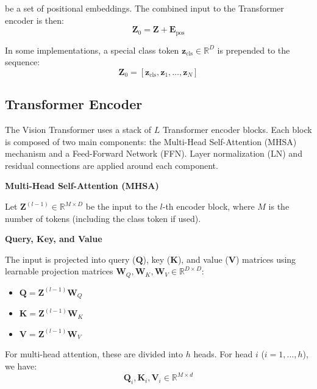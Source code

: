 be a set of positional embeddings. The combined input to the Transformer encoder is then:
\begin{equation}
  \mathbf{Z}_0 = \mathbf{Z} + \mathbf{E}_{\text{pos}}
\end{equation}

In some implementations, a special class token \(\mathbf{z}_{\text{cls}} \in \mathbb{R}^{D}\) is prepended to the sequence:
\begin{equation}
  \mathbf{Z}_0 = \left[\mathbf{z}_{\text{cls}}, \mathbf{z}_1, \dots, \mathbf{z}_N \right]
\end{equation}

\subsection{Transformer Encoder}

The Vision Transformer uses a stack of \(L\) Transformer encoder blocks. Each block is composed of two main components: the Multi-Head Self-Attention (MHSA) mechanism and a Feed-Forward Network (FFN). Layer normalization (LN) and residual connections are applied around each component.

\textbf{Multi-Head Self-Attention (MHSA)}

Let \(\mathbf{Z}^{(l-1)} \in \mathbb{R}^{M \times D}\) be the input to the \(l\)-th encoder block, where \(M\) is the number of tokens (including the class token if used).

\textbf{Query, Key, and Value}

The input is projected into query (\(\mathbf{Q}\)), key (\(\mathbf{K}\)), and value (\(\mathbf{V}\)) matrices using learnable projection matrices \(\mathbf{W}_Q, \mathbf{W}_K, \mathbf{W}_V \in \mathbb{R}^{D \times D}\):

\begin{itemize}
  \item \(\mathbf{Q} = \mathbf{Z}^{(l-1)} \mathbf{W}_Q\)
  \item \(\mathbf{K} = \mathbf{Z}^{(l-1)} \mathbf{W}_K\)
  \item \(\mathbf{V} = \mathbf{Z}^{(l-1)} \mathbf{W}_V\)
\end{itemize}

For multi-head attention, these are divided into \(h\) heads. For head \(i\) (\(i=1,\dots,h\)), we have:
\begin{equation}
  \mathbf{Q}_i, \mathbf{K}_i, \mathbf{V}_i \in \mathbb{R}^{M \times d} 
\end{equation}

